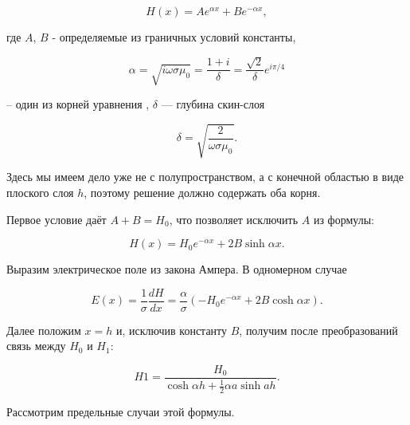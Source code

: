 \documentclass[a4paper,12pt]{article} %
\begin{document}
\[ H(x) = A e^{\alpha x} + B e^{-\alpha x}, \]

где $A$, $B$ -  определяемые из граничных условий константы,

\[ \alpha = \sqrt{i \omega \sigma \mu_0} = \frac{1 + i}{\delta} = \frac{\sqrt{2}}{\delta} e^{i \pi/4} \]

-- один из корней уравнения , $\delta$ — глубина скин-слоя

\[ \delta = \sqrt{\frac{2}{\omega \sigma \mu_0}}. \]

Здесь мы имеем дело уже не с полупространством, а с конечной областью в виде плоского слоя $h$, поэтому решение должно содержать оба корня.

Первое условие даёт $A + B = H_0$, что позволяет исключить $A$ из формулы:

\[ H(x) = H_0 e^{- \alpha x} + 2B \sinh{\alpha x}. \]

Выразим электрическое поле из закона Ампера. В одномерном случае

\[ E(x) = \frac{1}{\sigma} \frac{dH}{dx} = \frac{\alpha}{\sigma}(-H_0 e^{-\alpha x} + 2B \cosh{\alpha x}). \]

Далее положим $x = h$ и, исключив константу $B$, получим после преобразований связь между $H_0$ и $H_1$:

\[ H1 = \frac{H_0}{\cosh{\alpha h} + \frac{1}{2} \alpha a \sinh{ah}}. \]

Рассмотрим предельные случаи этой формулы.
\end{document}
